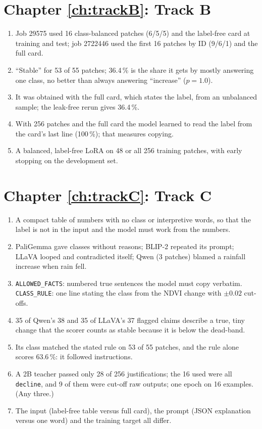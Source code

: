 \section*{Chapter \ref{ch:trackB}: Track B}
\begin{enumerate}
  \item Job 29575 used 16 class-balanced patches (6/5/5) and the label-free card at training and test; job 2722446 used the first 16 patches by ID (9/6/1) and the full card.
  \item ``Stable'' for 53 of 55 patches; 36.4\,\% is the share it gets by mostly answering one class, no better than always answering ``increase'' ($p = 1.0$).
  \item It was obtained with the full card, which states the label, from an unbalanced sample; the leak-free rerun gives 36.4\,\%.
  \item With 256 patches and the full card the model learned to read the label from the card's last line (100\,\%); that measures copying.
  \item A balanced, label-free LoRA on 48 or all 256 training patches, with early stopping on the development set.
\end{enumerate}

\section*{Chapter \ref{ch:trackC}: Track C}
\begin{enumerate}
  \item A compact table of numbers with no class or interpretive words, so that the label is not in the input and the model must work from the numbers.
  \item PaliGemma gave classes without reasons; BLIP-2 repeated its prompt; LLaVA looped and contradicted itself; Qwen (3 patches) blamed a rainfall increase when rain fell.
  \item \texttt{ALLOWED\_FACTS}: numbered true sentences the model must copy verbatim. \texttt{CLASS\_RULE}: one line stating the class from the NDVI change with $\pm0.02$ cut-offs.
  \item 35 of Qwen's 38 and 35 of LLaVA's 37 flagged claims describe a true, tiny change that the scorer counts as stable because it is below the dead-band.
  \item Its class matched the stated rule on 53 of 55 patches, and the rule alone scores 63.6\,\%: it followed instructions.
  \item A 2B teacher passed only 28 of 256 justifications; the 16 used were all \texttt{decline}, and 9 of them were cut-off raw outputs; one epoch on 16 examples. (Any three.)
  \item The input (label-free table versus full card), the prompt (JSON explanation versus one word) and the training target all differ.
\end{enumerate}

